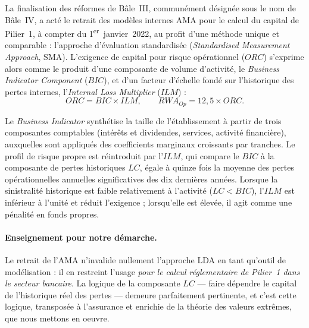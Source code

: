 \documentclass[11pt,a4paper]{article}
\theoremstyle{navystyle}
\theoremstyle{navydef}
\begin{document}
La finalisation des réformes de Bâle~III, communément désignée sous le nom de Bâle~IV,
a acté le retrait des modèles internes AMA pour le calcul du capital de Pilier~1, à
compter du 1\textsuperscript{er}~janvier~2022, au profit d'une méthode unique et
comparable : l'approche d'évaluation standardisée (\emph{Standardised Measurement
Approach}, SMA). L'exigence de capital pour risque opérationnel ($ORC$) s'exprime alors
comme le produit d'une composante de volume d'activité, le \emph{Business Indicator
Component} ($BIC$), et d'un facteur d'échelle fondé sur l'historique des pertes internes,
l'\emph{Internal Loss Multiplier} ($ILM$) :
\begin{equation}
ORC = BIC \times ILM,
\qquad
RWA_{Op} = 12{,}5 \times ORC.
\end{equation}

Le \emph{Business Indicator} synthétise la taille de l'établissement à partir de trois
composantes comptables (intérêts et dividendes, services, activité financière), auxquelles
sont appliqués des coefficients marginaux croissants par tranches. Le profil de risque
propre est réintroduit par l'$ILM$, qui compare le $BIC$ à la composante de pertes
historiques $LC$, égale à quinze fois la moyenne des pertes opérationnelles annuelles
significatives des dix dernières années. Lorsque la sinistralité historique est faible
relativement à l'activité ($LC < BIC$), l'$ILM$ est inférieur à l'unité et réduit
l'exigence ; lorsqu'elle est élevée, il agit comme une pénalité en fonds propres.

\paragraph{Enseignement pour notre démarche.} Le retrait de l'AMA n'invalide nullement
l'approche LDA en tant qu'outil de modélisation : il en restreint l'usage \emph{pour le
calcul réglementaire de Pilier~1 dans le secteur bancaire}. La logique de la composante
$LC$ --- faire dépendre le capital de l'historique réel des pertes --- demeure
parfaitement pertinente, et c'est cette logique, transposée à l'assurance et enrichie de
la théorie des valeurs extrêmes, que nous mettons en oeuvre.
\end{document}
